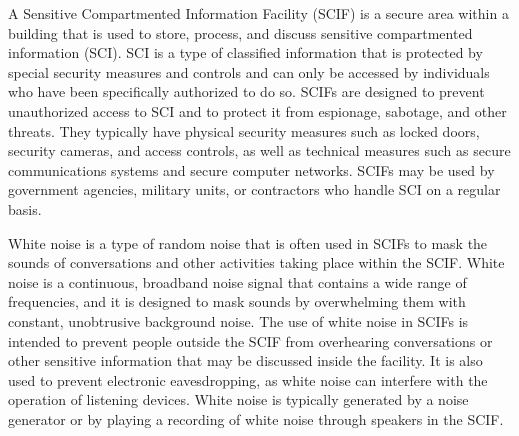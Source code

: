 A Sensitive Compartmented Information Facility (SCIF) is a secure area within a building that is used to store, process, and discuss sensitive compartmented information (SCI). SCI is a type of classified information that is protected by special security measures and controls and can only be accessed by individuals who have been specifically authorized to do so. SCIFs are designed to prevent unauthorized access to SCI and to protect it from espionage, sabotage, and other threats. They typically have physical security measures such as locked doors, security cameras, and access controls, as well as technical measures such as secure communications systems and secure computer networks. SCIFs may be used by government agencies, military units, or contractors who handle SCI on a regular basis.

White noise is a type of random noise that is often used in SCIFs to mask the sounds of conversations and other activities taking place within the SCIF. White noise is a continuous, broadband noise signal that contains a wide range of frequencies, and it is designed to mask sounds by overwhelming them with constant, unobtrusive background noise. The use of white noise in SCIFs is intended to prevent people outside the SCIF from overhearing conversations or other sensitive information that may be discussed inside the facility. It is also used to prevent electronic eavesdropping, as white noise can interfere with the operation of listening devices. White noise is typically generated by a noise generator or by playing a recording of white noise through speakers in the SCIF.
